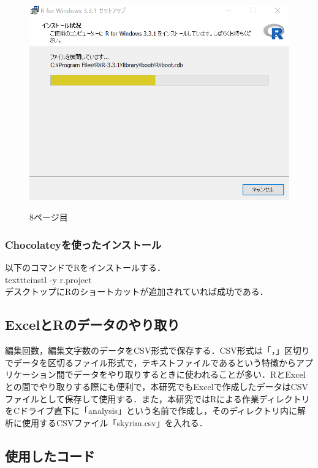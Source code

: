 \begin{figure}[!htbp]
\centering　
\includegraphics[width=13cm]{rinstall8.png}
\caption{8ページ目}
\end{figure}

\newpage
\subsubsection{Chocolateyを使ったインストール}



以下のコマンドでRをインストールする．\\

texttt{cinstl -y r.project}\\

デスクトップにRのショートカットが追加されていれば成功である．

\newpage
\subsection{ExcelとRのデータのやり取り}


編集回数，編集文字数のデータをCSV形式で保存する．CSV形式は「，」区切りでデータを区切るファイル形式で，テキストファイルであるという特徴からアプリケーション間でデータをやり取りするときに使われることが多い．RとExcelとの間でやり取りする際にも便利で，本研究でもExcelで作成したデータはCSVファイルとして保存して使用する．また，本研究ではRによる作業ディレクトリをCドライブ直下に「analysis」という名前で作成し，そのディレクトリ内に解析に使用するCSVファイル「skyrim.csv」を入れる．

\subsection{使用したコード}

